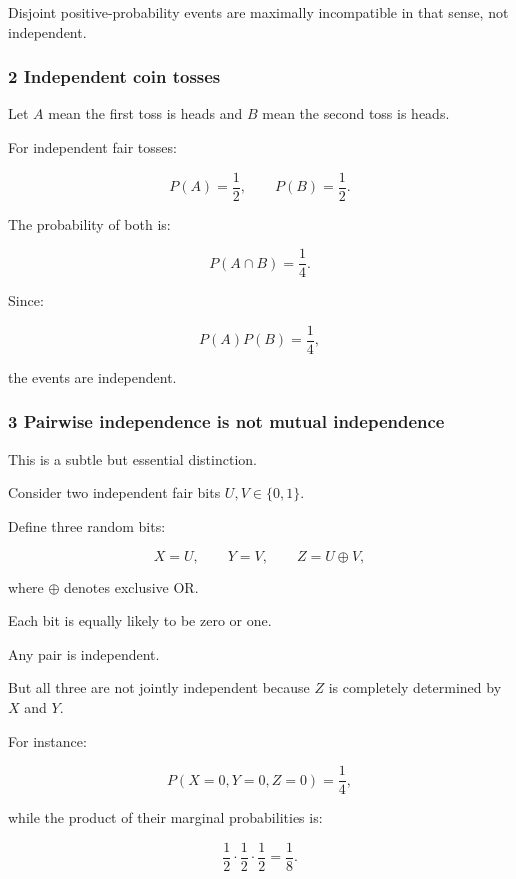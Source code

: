 Disjoint positive-probability events are maximally incompatible in that sense, not independent.

\subsubsection{2 Independent coin tosses}\label{02-foundations-ii-ch023-independent-coin-tosses}

\hypertarget{02-foundations-ii-ch023-independent-coin-tosses}{}

Let \(A\) mean the first toss is heads and \(B\) mean the second toss is heads.

For independent fair tosses:

\[
 P(A)=\frac12, \qquad P(B)=\frac12.
\]

The probability of both is:

\[
 P(A\cap B)=\frac14.
\]

Since:

\[
 P(A)P(B)=\frac14,
\]

the events are independent.

\subsubsection{3 Pairwise independence is not mutual independence}\label{02-foundations-ii-ch023-pairwise-independence-is-not-mutual-independence}

\hypertarget{02-foundations-ii-ch023-pairwise-independence-is-not-mutual-independence}{}

This is a subtle but essential distinction.

Consider two independent fair bits \(U,V\in\{0,1\}\).

Define three random bits:

\[
 X=U, \qquad Y=V, \qquad Z=U\oplus V,
\]

where \(\oplus\) denotes exclusive OR.

Each bit is equally likely to be zero or one.

Any pair is independent.

But all three are not jointly independent because \(Z\) is completely determined by \(X\) and \(Y\).

For instance:

\[
 P(X=0,Y=0,Z=0)=\frac14,
\]

while the product of their marginal probabilities is:

\[
 \frac12\cdot\frac12\cdot\frac12=\frac18.
\]

